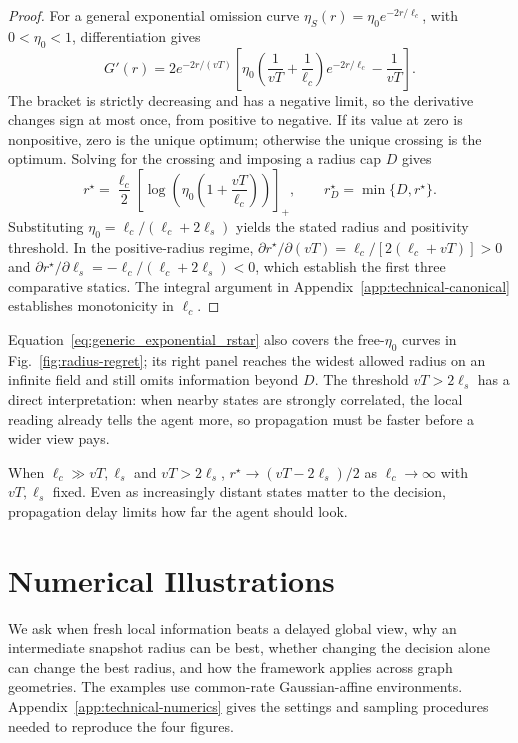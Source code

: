 \documentclass[11pt]{article}
\begin{document}
\begin{proof}
For a general exponential omission curve $\eta_S(r)=\eta_0e^{-2r/\ell_c}$,
with $0<\eta_0<1$, differentiation gives
\[
G'(r)=2e^{-2r/(vT)}\left[
\eta_0\left(\frac{1}{vT}+\frac{1}{\ell_c}\right)e^{-2r/\ell_c}
-\frac{1}{vT}\right].
\]
The bracket is strictly decreasing and has a negative limit, so the
derivative changes sign at most once, from positive to negative.
If its value at zero is nonpositive, zero is the unique optimum;
otherwise the unique crossing is the optimum. Solving for the crossing
and imposing a radius cap $D$ gives
\begin{equation}
r^\star=\frac{\ell_c}{2}
\left[\log\!\left(\eta_0\left(1+\frac{vT}{\ell_c}\right)\right)\right]_+,
\qquad r_D^\star=\min\{D,r^\star\}.
\label{eq:generic_exponential_rstar}
\end{equation}
Substituting $\eta_0=\ell_c/(\ell_c+2\ell_s)$ yields the stated radius
and positivity threshold. In the positive-radius regime,
$\partial r^\star/\partial(vT)=\ell_c/[2(\ell_c+vT)]>0$ and
$\partial r^\star/\partial\ell_s=-\ell_c/(\ell_c+2\ell_s)<0$,
which establish the first three comparative statics.
The integral argument in Appendix~\ref{app:technical-canonical} establishes
monotonicity in $\ell_c$.
\end{proof}

Equation~\eqref{eq:generic_exponential_rstar} also covers the free-$\eta_0$
curves in Fig.~\ref{fig:radius-regret}; its right panel reaches the widest
allowed radius on an infinite field and still omits information beyond $D$.
The threshold $vT>2\ell_s$ has a direct interpretation: when nearby states
are strongly correlated, the local reading already tells the agent more,
so propagation must be faster before a wider view pays.

When $\ell_c\gg vT,\ell_s$ and $vT>2\ell_s$,
$r^\star\to(vT-2\ell_s)/2$ as $\ell_c\to\infty$ with $vT,\ell_s$ fixed.
Even as increasingly distant states matter to the decision, propagation
delay limits how far the agent should look.

\section{Numerical Illustrations}
\label{sec:numerical-evaluation}

We ask when fresh local information beats a delayed global view, why an
intermediate snapshot radius can be best, whether changing the decision alone
can change the best radius, and how the framework applies across graph geometries. The
examples use common-rate Gaussian-affine environments.
Appendix~\ref{app:technical-numerics} gives the settings and sampling
procedures needed to reproduce the four figures.
\end{document}

